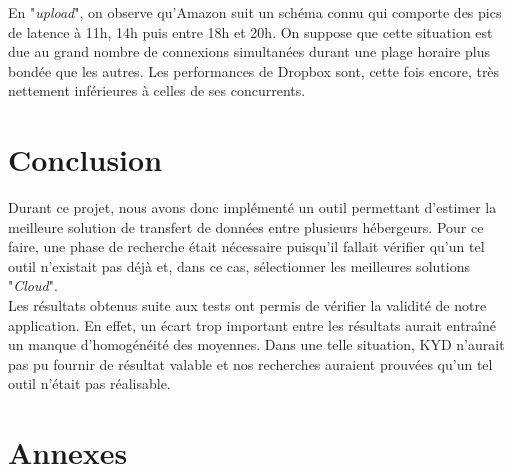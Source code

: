 \documentclass[10pt]{article}
\begin{document}
En "\textit{upload}", on observe qu'Amazon suit un schéma connu qui comporte des
pics de latence à 11h, 14h puis entre 18h et 20h. On suppose que cette situation
est due au grand nombre de connexions simultanées durant une plage horaire plus
bondée que les autres. Les performances de Dropbox sont, cette fois encore, très
nettement inférieures à celles de ses concurrents.



\section{Conclusion}

Durant ce projet, nous avons donc implémenté un outil permettant d'estimer la
meilleure solution de transfert de données entre plusieurs hébergeurs. Pour ce
faire, une phase de recherche était nécessaire puisqu'il fallait vérifier qu'un
tel outil n'existait pas déjà et, dans ce cas, sélectionner les meilleures
solutions "\textit{Cloud}".\\

Les résultats obtenus suite aux tests ont permis de vérifier la validité de
notre application. En effet, un écart trop important entre les résultats aurait
entraîné un manque d'homogénéité des moyennes. Dans une telle situation, KYD
n'aurait pas pu fournir de résultat valable et nos recherches auraient prouvées
qu'un tel outil n'était pas réalisable.\\

\section{Annexes}
\end{document}
